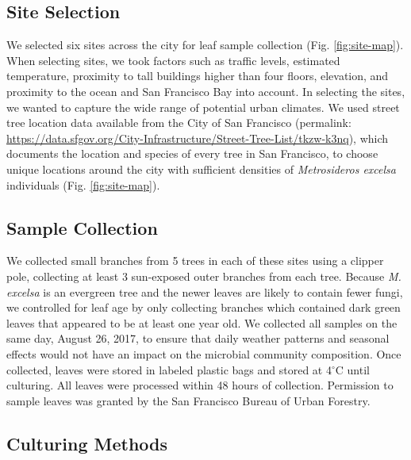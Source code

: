 \documentclass[fleqn,10pt,lineno]{wlpeerj} %
\begin{document}
\hypertarget{site-selection}{%
\subsection*{Site Selection}\label{site-selection}}

We selected six sites across the city for leaf sample collection (Fig. \ref{fig:site-map}). When selecting sites, we took factors such as traffic levels, estimated temperature, proximity to tall buildings higher than four floors, elevation, and proximity to the ocean and San Francisco Bay into account. In selecting the sites, we wanted to capture the wide range of potential urban climates. We used street tree location data available from the City of San Francisco (permalink: \url{https://data.sfgov.org/City-Infrastructure/Street-Tree-List/tkzw-k3nq}), which documents the location and species of every tree in San Francisco, to choose unique locations around the city with sufficient densities of \emph{Metrosideros excelsa} individuals (Fig. \ref{fig:site-map}).

\hypertarget{sample-collection}{%
\subsection*{Sample Collection}\label{sample-collection}}

We collected small branches from 5 trees in each of these sites using a clipper pole, collecting at least 3 sun-exposed outer branches from each tree. Because \emph{M. excelsa} is an evergreen tree and the newer leaves are likely to contain fewer fungi, we controlled for leaf age by only collecting branches which contained dark green leaves that appeared to be at least one year old. We collected all samples on the same day, August 26, 2017, to ensure that daily weather patterns and seasonal effects would not have an impact on the microbial community composition. Once collected, leaves were stored in labeled plastic bags and stored at 4\(^{\circ}\)C until culturing. All leaves were processed within 48 hours of collection. Permission to sample leaves was granted by the San Francisco Bureau of Urban Forestry.

\hypertarget{culturing-methods}{%
\subsection*{Culturing Methods}\label{culturing-methods}}
\end{document}
